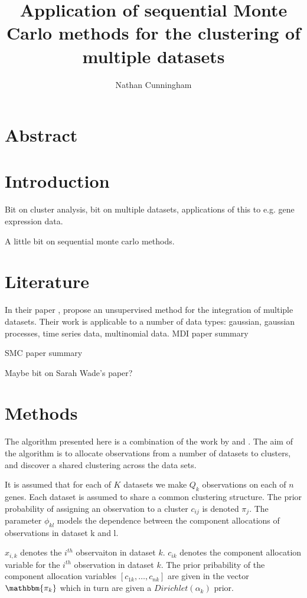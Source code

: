 \documentclass[10pt,a4paper]{report}
\author{Nathan Cunningham}
\title{Application of sequential Monte Carlo methods for the clustering of multiple datasets}
\begin{document}
\maketitle

\section*{Abstract}

\section{Introduction}

Bit on cluster analysis, bit on multiple datasets, applications of this to e.g. gene expression data.

A little bit on sequential monte carlo methods.






\section{Literature}
In their paper \cite{kirk2012bayesian}, \citeauthor{kirk2012bayesian} propose an unsupervised method for the integration of multiple datasets. Their work is applicable to a number of data types: gaussian, gaussian processes, time series data, multinomial data.
MDI paper summary \cite{kirk2012bayesian}

SMC paper summary \cite{griffin2014sequential}




Maybe bit on Sarah Wade's paper?
\cite{wade2015bayesian}
\section{Methods}
The algorithm presented here is a combination of the work by \citeauthor{griffin2014sequential} and \citeauthor{kirk2012bayesian}. The aim of the algorithm is to allocate observations from a number of datasets to clusters, and discover a shared clustering across the data sets.

It is assumed that for each of $K$ datasets we make $Q_k$ observations on each of $n$ genes. Each dataset is assumed to share a common clustering structure. The prior probability of assigning an observation to a cluster $c_{ij}$ is denoted $\pi_j$. The parameter $\phi_{kl}$ models the dependence between the component allocations of observations in dataset  k and l.

$x_{i,k}$ denotes the $i^{th}$ observaiton in dataset $k$.
$c_{ik}$ denotes the component allocation variable for the $i^{th}$ observation in dataset $k$. The prior pribability of the component allocation variables $[c_{1k}, \dots, c_{nk}]$ are given in the vector $\mathbbm{\pi_{k}}$ which in turn are given a $Dirichlet(\alpha_k)$ prior.
\end{document}
